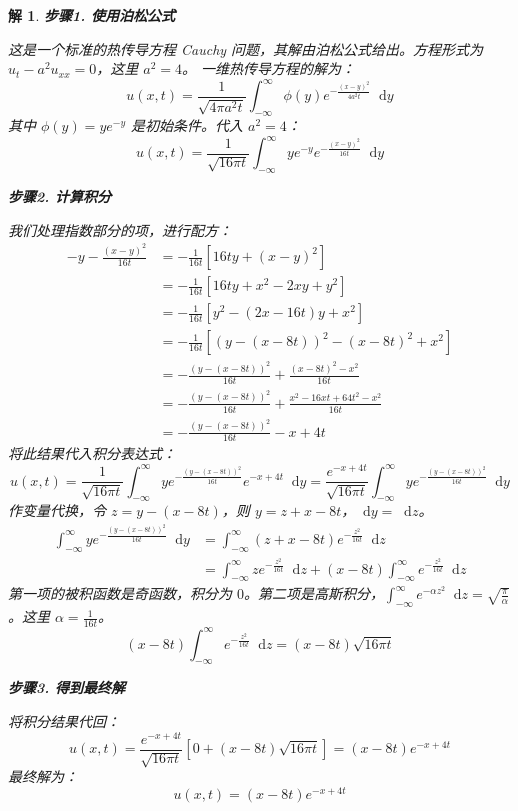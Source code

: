 \documentclass[12pt,a4paper]{article}
\newcommand{\diff}{\mathop{}\!\mathrm{d}}  %
\newtheorem*{solution}{解}
\begin{document}
	\begin{solution}
		\textbf{步骤1. 使用泊松公式}
		
		\noindent
		这是一个标准的热传导方程 Cauchy 问题，其解由泊松公式给出。方程形式为 $u_t - a^2 u_{xx}=0$，这里 $a^2=4$。
		一维热传导方程的解为：
		\[
		u(x,t) = \frac{1}{\sqrt{4\pi a^2 t}} \int_{-\infty}^{\infty} \phi(y) e^{-\frac{(x-y)^2}{4a^2t}} \diff y
		\]
		其中 $\phi(y) = ye^{-y}$ 是初始条件。代入 $a^2=4$：
		\[
		u(x,t) = \frac{1}{\sqrt{16\pi t}} \int_{-\infty}^{\infty} y e^{-y} e^{-\frac{(x-y)^2}{16t}} \diff y
		\]
		
		\hrulefill
		
		\textbf{步骤2. 计算积分}
		
		\noindent
		我们处理指数部分的项，进行配方：
		\begin{align*}
			-y - \frac{(x-y)^2}{16t} &= -\frac{1}{16t} [16ty + (x-y)^2] \\
			&= -\frac{1}{16t} [16ty + x^2 - 2xy + y^2] \\
			&= -\frac{1}{16t} [y^2 - (2x-16t)y + x^2] \\
			&= -\frac{1}{16t} \left[ \left(y - (x-8t)\right)^2 - (x-8t)^2 + x^2 \right] \\
			&= -\frac{(y - (x-8t))^2}{16t} + \frac{(x-8t)^2 - x^2}{16t} \\
			&= -\frac{(y - (x-8t))^2}{16t} + \frac{x^2 - 16xt + 64t^2 - x^2}{16t} \\
			&= -\frac{(y - (x-8t))^2}{16t} - x + 4t
		\end{align*}
		将此结果代入积分表达式：
		\[
		u(x,t) = \frac{1}{\sqrt{16\pi t}} \int_{-\infty}^{\infty} y e^{-\frac{(y - (x-8t))^2}{16t}} e^{-x+4t} \diff y = \frac{e^{-x+4t}}{\sqrt{16\pi t}} \int_{-\infty}^{\infty} y e^{-\frac{(y - (x-8t))^2}{16t}} \diff y
		\]
		作变量代换，令 $z = y - (x-8t)$，则 $y = z + x - 8t$，$\diff y = \diff z$。
		\begin{align*}
			\int_{-\infty}^{\infty} y e^{-\frac{(y - (x-8t))^2}{16t}} \diff y &= \int_{-\infty}^{\infty} (z + x - 8t) e^{-\frac{z^2}{16t}} \diff z \\
			&= \int_{-\infty}^{\infty} z e^{-\frac{z^2}{16t}} \diff z + (x-8t) \int_{-\infty}^{\infty} e^{-\frac{z^2}{16t}} \diff z
		\end{align*}
		第一项的被积函数是奇函数，积分为 $0$。第二项是高斯积分，$\int_{-\infty}^{\infty} e^{-\alpha z^2}\diff z = \sqrt{\frac{\pi}{\alpha}}$。这里 $\alpha = \frac{1}{16t}$。
		\[
		(x-8t) \int_{-\infty}^{\infty} e^{-\frac{z^2}{16t}} \diff z = (x-8t)\sqrt{16\pi t}
		\]
		
		\hrulefill
		
		\textbf{步骤3. 得到最终解}
		
		\noindent
		将积分结果代回：
		\[
		u(x,t) = \frac{e^{-x+4t}}{\sqrt{16\pi t}} \left[ 0 + (x-8t)\sqrt{16\pi t} \right] = (x-8t)e^{-x+4t}
		\]
		最终解为：
		\[
		u(x,t) = (x-8t)e^{-x+4t}
		\]
	\end{solution}
\end{document}
